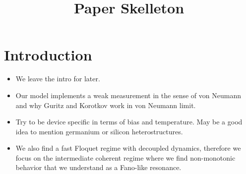 \documentclass[10pt,
 amsmath,amssymb,
 aps,prb, twocolumn
]{revtex4-2}
\title{Paper Skelleton}
\begin{document}
\section{Introduction}\label{sect:intro}
\begin{itemize}
    \item We leave the intro for later.

     \item Our model implements a weak measurement in the sense of von Neumann \cite{vonNeumann1932} and why Guritz and Korotkov work in von Neumann limit. 

    \item Try to be device specific in terms of bias and temperature. May be a good idea to mention germanium or silicon heterostructures.
    
    \item We also find a fast Floquet regime with decoupled dynamics, therefore we focus on the intermediate coherent regime where we find non-monotonic behavior that we understand as a Fano-like resonance.

\end{itemize}
\end{document}
